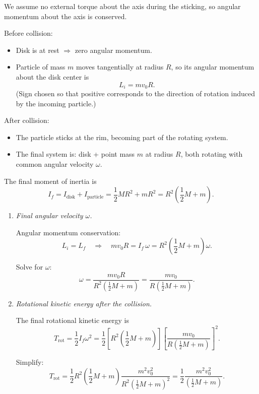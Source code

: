 \documentclass[12pt]{article}
\begin{document}
\begin{enumerate}
We assume no external torque about the axis during the sticking, so angular momentum about the axis is conserved.

Before collision:
\begin{itemize}
\item Disk is at rest $\Rightarrow$ zero angular momentum.
\item Particle of mass $m$ moves tangentially at radius $R$, so its angular momentum about the disk center is
\[
L_i = m v_0 R.
\]
(Sign chosen so that positive corresponds to the direction of rotation induced by the incoming particle.)
\end{itemize}

After collision:
\begin{itemize}
\item The particle sticks at the rim, becoming part of the rotating system.
\item The final system is: disk + point mass $m$ at radius $R$, both rotating with common angular velocity $\omega$.
\end{itemize}

The final moment of inertia is
\[
I_f
= I_{\text{disk}} + I_{\text{particle}}
= \frac{1}{2} M R^2 + m R^2
= R^2 \left( \frac{1}{2} M + m \right).
\]

\begin{enumerate}
    \item \textit{Final angular velocity $\omega$.}

    Angular momentum conservation:
    \[
    L_i = L_f
    \quad\Rightarrow\quad
    m v_0 R = I_f \,\omega
    = R^2 \left( \frac{1}{2} M + m \right) \omega.
    \]

    Solve for $\omega$:
    \[
    \omega
    = \frac{m v_0 R}{ R^2 \left( \frac{1}{2} M + m \right) }
    = \frac{m v_0}{ R \left( \frac{1}{2} M + m \right) }.
    \]

    \item \textit{Rotational kinetic energy after the collision.}

    The final rotational kinetic energy is
    \[
    T_\text{rot}
    = \frac{1}{2} I_f \omega^2
    = \frac{1}{2}
    \left[ R^2 \left( \frac{1}{2} M + m \right) \right]
    \left[
    \frac{m v_0}{ R \left( \frac{1}{2} M + m \right) }
    \right]^2.
    \]

    Simplify:
    \[
    T_\text{rot}
    = \frac{1}{2}
    R^2 \left( \frac{1}{2} M + m \right)
    \frac{m^2 v_0^2}{
    R^2 \left( \frac{1}{2} M + m \right)^2 }
    = \frac{1}{2}
    \frac{m^2 v_0^2}{
    \left( \frac{1}{2} M + m \right) }.
    \]


\end{enumerate}
\end{enumerate}
\end{document}
